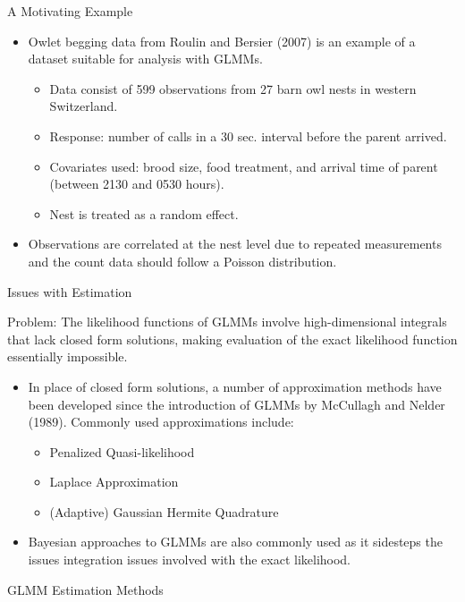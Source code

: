\documentclass{beamer}\usepackage[]{graphicx}\usepackage[]{color}
\begin{document}
\begin{frame}{A Motivating Example}
  \begin{itemize}
        \item Owlet begging data from Roulin and Bersier (2007) is an example of a dataset suitable for analysis with GLMMs.
        \begin{itemize}
          \item Data consist of 599 observations from 27 barn owl nests in western Switzerland.
          \item Response: number of calls in a 30 sec. interval before the parent arrived. 
          \item Covariates used: brood size, food treatment, and arrival time of parent (between 2130 and 0530 hours).
          \item Nest is treated as a random effect. 
        \end{itemize}
        \item Observations are correlated at the nest level due to repeated measurements and the count data should follow a Poisson distribution. 
  \end{itemize}
\end{frame}

\begin{frame}{Issues with Estimation}
	 \begin{block}{Problem:}
      The likelihood functions of GLMMs involve high-dimensional integrals that lack closed form solutions, making evaluation of the exact likelihood function essentially impossible. 
   \end{block}
	
	\begin{itemize}
		\item In place of closed form solutions, a number of approximation methods have been developed since the introduction of GLMMs by McCullagh and Nelder (1989).           Commonly used approximations include:
    	\begin{itemize}
    		\item Penalized Quasi-likelihood
    		\item Laplace Approximation
    		\item (Adaptive) Gaussian Hermite Quadrature
    	\end{itemize}
		\item Bayesian approaches to GLMMs are also commonly used as it sidesteps the issues integration issues involved with the exact likelihood.
	\end{itemize}
\end{frame}

\begin{frame}{GLMM Estimation Methods}
	

\end{frame}

\end{document}
